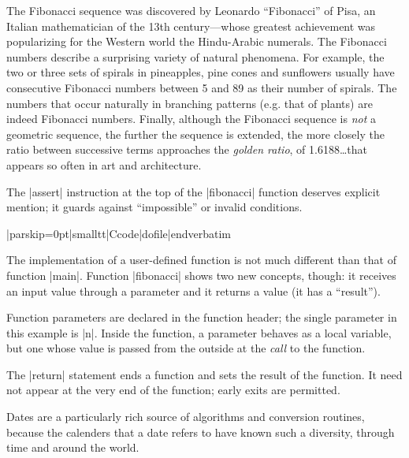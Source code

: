  
The Fibonacci sequence was discovered by Leonardo ``Fibonacci'' of Pisa, an
Italian mathematician of the 13th century---whose greatest achievement was
popularizing for the Western world the Hindu-Arabic numerals. The Fibonacci
numbers describe a surprising variety of natural phenomena. For example, the
two or three sets of spirals in pineapples, pine cones and sunflowers usually
have consecutive Fibonacci numbers between 5 and 89 as their number of
spirals. The numbers that occur naturally in branching patterns (e.g. that of
plants) are indeed Fibonacci numbers. Finally, although the Fibonacci sequence
is {\it not\/} a geometric sequence, the further the sequence is extended, the
more closely the ratio between successive terms approaches the {\it golden
ratio\/}, of 1.6188\dots that appears so often in art and architecture.

\noindent{}%
The |assert| instruction at the top of the |fibonacci| function deserves
explicit mention; it guards against ``impossible'' or invalid conditions.

 
\bigskip{}
\verbatim|parskip=0pt|smalltt|Ccode|dofile|endverbatim\endlistingx

\noindent{}%
The implementation of a user-defined function is not much different than that
of function |main|. Function |fibonacci| shows two new concepts, though: it
receives an input value through a parameter and it returns a value (it has a
``result'').

Function parameters are declared in the function header; the single parameter
in this example is |n|. Inside the function, a parameter behaves as a local
variable, but one whose value is passed from the outside at the {\it call\/} to
the function.

The |return| statement ends a function and sets the result of the function. It
need not appear at the very end of the function; early exits are permitted.

\dingbatseparator

Dates are a particularly rich source of algorithms and conversion routines,
because the calenders that a date refers to have known such a diversity,
through time and around the world.

